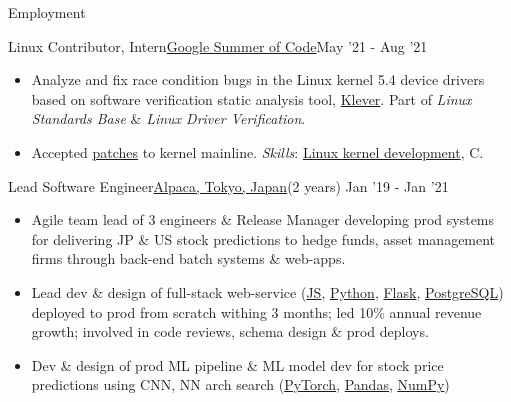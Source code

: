 \documentclass[]{mcdowellcv}
\begin{document}
\begin{cvsection}{Employment}
        \begin{cvsubsection}{Linux Contributor, Intern}{\href{https://summerofcode.withgoogle.com/archive/2021/projects/4818588170452992}{Google Summer of Code}}{May '21 - Aug '21}
            \begin{itemize}
                \item Analyze and fix race condition bugs in the Linux kernel 5.4 device drivers based on software verification static analysis tool, \href{https://forge.ispras.ru/projects/klever}{Klever}. Part of \textit{Linux Standards Base} \& \textit{Linux Driver Verification}.
                \item Accepted \href{https://lore.kernel.org/lkml/?q=saubhik}{patches} to kernel mainline. \textit{Skills}: \href{https://www.kernel.org/}{Linux kernel development}, C.
            \end{itemize}
        \end{cvsubsection}

        \begin{cvsubsection}{Lead Software Engineer}{\href{https://www.alpaca.ai}{Alpaca, Tokyo, Japan}}{(2 years) Jan '19 - Jan '21}
            \begin{itemize}
                \item Agile team lead of 3 engineers \& Release Manager developing prod systems for delivering JP \& US stock predictions to hedge funds, asset management firms through back-end batch systems \& web-apps.
                \item Lead dev \& design of full-stack web-service (\href{https://developer.mozilla.org/en-US/docs/Web/JavaScript}{JS}, \href{https://www.python.org/}{Python}, \href{https://flask.palletsprojects.com/}{Flask}, \href{https://www.postgresql.org/}{PostgreSQL}) deployed to prod from scratch withing 3 months; led 10\% annual revenue growth; involved in code reviews, schema design \& prod deploys.
                \item Dev \& design of prod ML pipeline \& ML model dev for stock price predictions using CNN, NN arch search (\href{https://pytorch.org/}{PyTorch}, \href{https://pandas.pydata.org/}{Pandas}, \href{https://numpy.org/}{NumPy})
            \end{itemize}
        \end{cvsubsection}


\end{cvsection}
\end{document}
